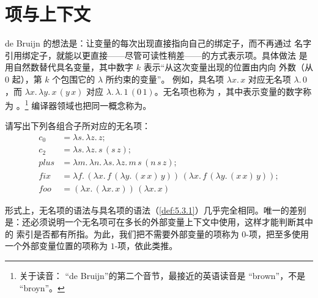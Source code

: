 \section{项与上下文}
\label{sec:6.1}

de Bruijn 的想法是：让变量的每次出现直接指向自己的绑定子，而不再通过
名字引用绑定子，就能以更直接——尽管可读性稍差——的方式表示项。具体做法
是用自然数替代具名变量，其中数字 \(k\) 表示“从这次变量出现的位置由内向
外数（从 \(0\) 起），第 \(k\) 个包围它的 \(\lambda\) 所约束的变量”。
例如，具名项
\(\lambda x.\,x\) 对应无名项 \(\lambda.\,0\)，而
\(\lambda x.\,\lambda y.\,x\,(y\,x)\) 对应
\(\lambda.\,\lambda.\,1\,(0\,1)\)。无名项也称为
，其中表示变量的数字称为
。\footnote{关于读音：
“de Bruijn”的第二个音节，最接近的英语读音是 “brown”，不是 “broyn”。}
编译器领域也把同一概念称为。

\begin{exercise}[\(\star\)]
\label{ex:6.1.1}
请写出下列各组合子所对应的无名项：
\[
\begin{aligned}
 c_0&=\lambda s.\,\lambda z.\,z;\\
 c_2&=\lambda s.\,\lambda z.\,s\,(s\,z);\\
 \mathit{plus}&=\lambda m.\,\lambda n.\,\lambda s.\,\lambda z.\,
                 m\,s\,(n\,s\,z);\\
 \mathit{fix}&=\lambda f.\,
   (\lambda x.\,f\,(\lambda y.\,(x\,x)\,y))\,
   (\lambda x.\,f\,(\lambda y.\,(x\,x)\,y));\\
 \mathit{foo}&=(\lambda x.\,(\lambda x.\,x))\,(\lambda x.\,x)
\end{aligned}
\]
\end{exercise}


形式上，无名项的语法与具名项的语法（\cref{def:5.3.1}）几乎完全相同。唯一的差别
是：还必须说明一个无名项可在多长的外部变量上下文中使用，这样才能判断其中的
索引是否都有所指。为此，我们把不需要外部变量的项称为 \(0\)-项，把至多使用
一个外部变量位置的项称为 \(1\)-项，依此类推。

